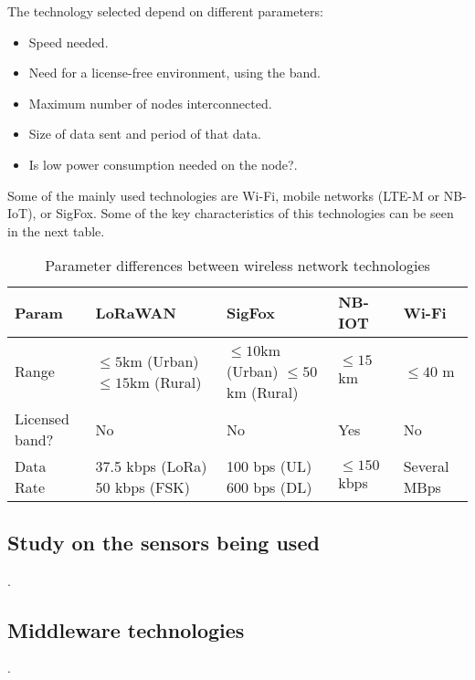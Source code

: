 The technology selected depend on different parameters:
\begin{itemize}
    \item Speed needed.
    \item Need for a license-free environment, using the  band.
    \item Maximum number of nodes interconnected.
    \item Size of data sent and period of that data.
    \item Is low power consumption needed on the node?.
\end{itemize}
Some of the mainly used technologies are Wi-Fi, mobile networks (LTE-M or NB-IoT),  or SigFox. Some of the key characteristics of this technologies can be seen in the next table.
\begin{table}[H]
    \begin{center}
        \begin{tabular}{p{} |  p{}  p{} p{} p{}}
            \hline
            \textbf{Param} & \textbf{LoRaWAN} & \textbf{SigFox} & \textbf{NB-IOT} & \textbf{Wi-Fi}\\
            \hline
            Range & \makecell{$\leq5$km (Urban)\\$\leq15$km (Rural)} & \makecell{$\leq10$km (Urban)\\$\leq50$km (Rural)} & $\leq15$ km & $\leq40$ m\\
            \hline
            Licensed band? & No & No & Yes & No\\
            \hline
            Data Rate & \makecell{37.5 kbps (LoRa) \\ 50 kbps (FSK)} & \makecell{100 bps (UL) \\ 600 bps (DL)} & $\leq150$ kbps & Several MBps\\
            \hline
        \end{tabular} 
    \end{center}
    \caption{Parameter differences between wireless network technologies}
    \label{ReqGeneral}
\end{table}

\subsection{Study on the sensors being used}
.

\subsection{Middleware technologies}
.